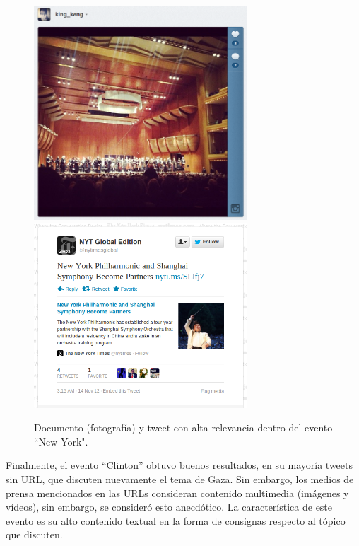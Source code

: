 \begin{figure}[h!]
  \centering
  \includegraphics[width=8cm]{./img/dvorak.png}
  \includegraphics[width=8cm]{./img/dvorak2.png}
  \caption[Imagen y documento con altos puntajes entre los resultados obtenidos]
   { Documento (fotografía) y tweet con alta relevancia dentro del evento
  ``New York". \label{fig:dvorak} }
\end{figure}

    Finalmente, el evento ``Clinton'' obtuvo buenos resultados, en su
    mayoría tweets sin URL, que discuten nuevamente el tema de
    Gaza. Sin embargo, los medios de prensa mencionados en las URLs
    consideran contenido multimedia (imágenes y vídeos), sin embargo,
    se consideró esto anecdótico. La característica de este evento es
    su alto contenido textual en la forma de consignas respecto al
    tópico que discuten.